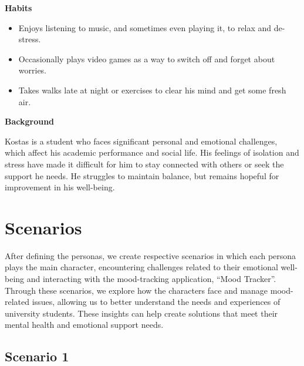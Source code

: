 \begin{center} \textbf{Habits} \end{center}
\begin{itemize}
    \item Enjoys listening to music, and sometimes even playing it, to relax and de-stress.
    \item Occasionally plays video games as a way to switch off and forget about worries.
    \item Takes walks late at night or exercises to clear his mind and get some fresh air.
\end{itemize}

\begin{center} \textbf{Background} \end{center}
Kostas is a student who faces significant personal and emotional challenges, which affect his academic performance and social life. His feelings of isolation and stress have made it difficult for him to stay connected with others or seek the support he needs. He struggles to maintain balance, but remains hopeful for improvement in his well-being.

\section{Scenarios}

After defining the personas, we create respective scenarios in which each persona plays the main character, encountering challenges related to their emotional well-being and interacting with the mood-tracking application, ``Mood Tracker''. Through these scenarios, we explore how the characters face and manage mood-related issues, allowing us to better understand the needs and experiences of university students. These insights can help create solutions that meet their mental health and emotional support needs.

\subsection{Scenario 1}

